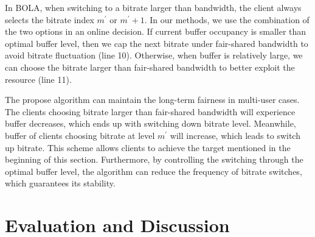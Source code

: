 \documentclass[journal]{IEEEtran}
\begin{document}
\par In BOLA, when switching to a bitrate larger than bandwidth, the client always selects the bitrate index $m^{\prime}$ or $m^{\prime}+1$. In our methods, we use the combination of the two options in an online decision. If current buffer occupancy is smaller than optimal buffer level, then we cap the next bitrate under fair-shared bandwidth to avoid bitrate fluctuation (line 10). Otherwise, when buffer is relatively large, we can choose the bitrate larger than fair-shared bandwidth to better exploit the resource (line 11).
\par The propose algorithm can maintain the long-term fairness in multi-user cases. The clients choosing bitrate larger than fair-shared bandwidth will experience buffer decreases, which ends up with switching down bitrate level. Meanwhile, buffer of clients choosing bitrate at level $m^{\prime}$ will increase, which leads to switch up bitrate. This scheme allows clients to achieve the target mentioned in the beginning of this section. Furthermore, by controlling the switching through the optimal buffer level, the algorithm can reduce the frequency of bitrate switches, which guarantees its stability.
\section{Evaluation and Discussion}
\end{document}
